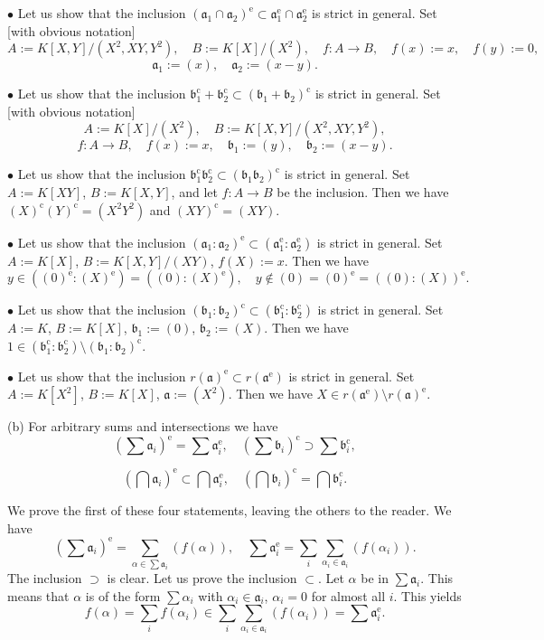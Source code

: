 \documentclass[12pt,letterpaper]{article}%
\newcommand{\oo}{\operatorname}\newcommand{\ooo}{\operatorname*}
\newcommand{\mf}{\mathfrak}
\newcommand{\aaa}{\mf a}
\newcommand{\bbb}{\mf b}
\newcommand{\bu}{\bullet}
\newcommand{\nn}{\noindent}
\begin{document}
\nn$\bu$ Let us show that the inclusion $(\aaa_1\cap\aaa_2)^{\oo e}\subset\aaa_1^{\oo e}\cap\aaa_2^{\oo e}$ is strict in general. Set [with obvious notation] 
$$
A:=K[X,Y]/(X^2,XY,Y^2),\quad B:=K[X]/(X^2),\quad f:A\to B,\quad f(x):=x,\quad f(y):=0,
$$ 
$$
\aaa_1:=(x),\quad\aaa_2:=(x-y).
$$

\nn$\bu$ Let us show that the inclusion $\bbb_1^{\oo c}+\bbb_2^{\oo c}\subset(\bbb_1+\bbb_2)^{\oo c}$ is strict in general. Set [with obvious notation] 
$$
A:=K[X]/(X^2),\quad B:=K[X,Y]/(X^2,XY,Y^2),
$$ 
$$
f:A\to B,\quad f(x):=x,\quad\bbb_1:=(y),\quad\bbb_2:=(x-y).
$$

\nn$\bu$ Let us show that the inclusion $\bbb_1^{\oo c}\bbb_2^{\oo c}\subset(\bbb_1\bbb_2)^{\oo c}$ is strict in general. Set $A:=K[XY]$, $B:=K[X,Y]$, and let $f:A\to B$ be the inclusion. Then we have $(X)^{\oo c}(Y)^{\oo c}=(X^2Y^2)$ and $(XY)^{\oo c}=(XY)$. 

\nn$\bu$ Let us show that the inclusion $(\aaa_1:\aaa_2)^{\oo e}\subset(\aaa_1^{\oo e}:\aaa_2^{\oo e})$ is strict in general. Set $A:=K[X]$, $B:=K[X,Y]/(XY)$, $f(X):=x$. Then we have 
$$
y\in((0)^{\oo e}:(X)^{\oo e})=((0):(X)^{\oo e}),\quad y\notin(0)=(0)^{\oo e}=((0):(X))^{\oo e}.
$$

\nn$\bu$ Let us show that the inclusion $(\bbb_1:\bbb_2)^{\oo c}\subset(\bbb_1^{\oo c}:\bbb_2^{\oo c})$ is strict in general. Set $A:=K$, $B:=K[X]$, $\bbb_1:=(0)$, $\bbb_2:=(X)$. Then we have $1\in(\bbb_1^{\oo c}:\bbb_2^{\oo c})\setminus(\bbb_1:\bbb_2)^{\oo c}$. 

\nn$\bu$ Let us show that the inclusion $r(\aaa)^{\oo e}\subset r(\aaa^{\oo e})$ is strict in general. Set $A:=K[X^2]$, $B:=K[X]$, $\aaa:=(X^2)$. Then we have $X\in r(\aaa^{\oo e})\setminus r(\aaa)^{\oo e}$. 

\nn(b) For arbitrary sums and intersections we have 
$$
\left(\sum\aaa_i\right)^{\oo e}=\sum\aaa_i^{\oo e},\quad\left(\sum\bbb_i\right)^{\oo c}\supset\sum\bbb_i^{\oo c},
$$

$$
\left(\bigcap\aaa_i\right)^{\oo e}\subset\bigcap\aaa_i^{\oo e},\quad\left(\bigcap\bbb_i\right)^{\oo c}=\bigcap\bbb_i^{\oo c}.
$$

We prove the first of these four statements, leaving the others to the reader. We have 
$$
\left(\sum\aaa_i\right)^{\oo e}=\sum_{\alpha\in\sum\aaa_i}(f(\alpha)),\quad\sum\aaa_i^{\oo e}=\sum_i\sum_{\alpha_i\in\aaa_i}(f(\alpha_i)).
$$ 
The inclusion $\supset$ is clear. Let us prove the inclusion $\subset$. Let $\alpha$ be in $\sum\aaa_i$. This means that $\alpha$ is of the form $\sum\alpha_i$ with $\alpha_i\in\aaa_i$, $\alpha_i=0$ for almost all $i$. This yields 
$$
f(\alpha)=\sum_if(\alpha_i)\in\sum_i\sum_{\alpha_i\in\aaa_i}(f(\alpha_i))=\sum\aaa_i^{\oo e}.
$$
\end{document}
